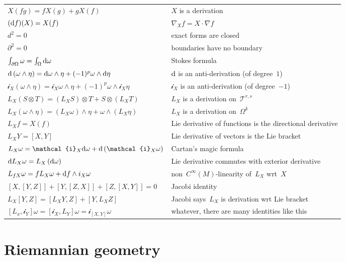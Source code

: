 \begin{tabular}{l|l}
	\hline
	$X(fg)=fX(g)+gX(f)$ & $X$ is a derivation \\
	$(\mathrm{d} f)(X)=X(f)$ & $\nabla_Xf=X\cdot \nabla f$\\
	$d^2=0$ & exact forms are closed \\
	$\partial^2=0$ & boundaries have no boundary \\
	$\int_{\partial\Omega}\omega=\int_\Omega\mathrm{d}\omega$ & Stokes formula \\
	$\mathrm{d}\left(\omega\wedge\eta\right)=
	\mathrm{d}\omega\wedge\eta+(-1)^p\omega\wedge\mathrm{d}\eta$ &
	$\mathrm{d}$ is an anti-derivation (of degree~$1$)\\
	$\mathcal{i}_X\left(\omega\wedge\eta\right)=
	\mathcal{i}_X\omega\wedge\eta+(-1)^p\omega\wedge\mathcal{i}_X\eta$
	& $\mathcal{i}_X$ is an anti-derivation (of degree~$-1$)\\
	$L_X\left(S\otimes T\right)=
	\left(L_XS\right)\otimes T
	+
	S\otimes\left(L_XT\right)
	$ & $L_X$ is a derivation on~$\mathcal{T}^{r,s}$\\
	$L_X\left(\omega\wedge\eta\right)=
	\left(L_X\omega\right)\wedge\eta
	+
	\omega\wedge\left(L_X\eta\right)
	$ & $L_X$ is a derivation on~$\Omega^k$\\
	$L_Xf=X(f)$ & Lie derivative of functions is the directional derivative\\
	$L_XY=[X,Y]$ & Lie derivative of vectors is the Lie bracket\\
	$L_X\omega=\mathcal{i}_X\ud\omega+\ud\left(\mathcal{i}_X\omega\right)$ &
	Cartan's magic formula \\
	$\mathrm{d} L_X\omega=L_X\left(\mathrm{d}\omega\right)$ &
	Lie derivative commutes with exterior derivative\\
	$L_{fX}\omega=fL_X\omega+\mathrm{d} f\wedge i_X\omega$ &
	non~$C^\infty(M)$-linearity of~$L_X$ wrt~$X$\\
	$[X,[Y,Z]]+[Y,[Z,X]]+[Z,[X,Y]]=0$ & Jacobi identity\\
	$L_X[Y,Z]=[L_XY,Z]+[Y,L_XZ]$ &
	Jacobi says~$L_X$ is derivation wrt Lie bracket\\
	$[L_x,\mathcal{i}_Y]\omega=
	[\mathcal{i}_X,L_Y]\omega=
	\mathcal{i}_{[X,Y]}\omega$ & whatever, there are many identities like this\\
\end{tabular}



\clearpage
\section{Riemannian geometry}

